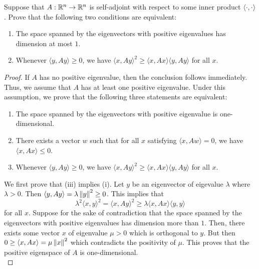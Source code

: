\documentclass[12pt]{article}
\begin{document}
\begin{problem} \label{problem-1.11}
	Suppose that $A : \mathbb{R}^n \to \mathbb{R}^n$ is self-adjoint with respect to some inner product $\langle \cdot, \cdot \rangle$. Prove that the following two conditions are equivalent:
    \begin{enumerate}[label = (\roman*)]
        \item The space spanned by the eigenvectors with positive eigenvalues has dimension at most $1$.
        \item Whenever $\langle y, Ay \rangle \geq 0$, we have $\langle x, Ay \rangle^2 \geq \langle x, Ax \rangle \langle y, Ay \rangle$ for all $x$. 
    \end{enumerate}
\end{problem}

\begin{proof}
	If $A$ has no positive eigenvalue, then the conclusion follows immediately. Thus, we assume that $A$ has at least one positive eigenvalue. Under this assumption, we prove that the following three statements are equivalent:
	\begin{enumerate}[label = (\roman*)]
		\item The space spanned by the eigenvectors with positive eigenvalue is one-dimensional.
		\item There exists a vector $w$ such that for all $x$ satisfying $\langle x , Aw \rangle = 0$, we have $\langle x, Ax \rangle \leq 0$.
		\item Whenever $\langle y, Ay \rangle \geq 0$, we have $\langle x, Ay \rangle^2 \geq \langle x, Ax \rangle \langle y, Ay \rangle$ for all $x$. 
	\end{enumerate}
	We first prove that (iii) implies (i). Let $y$ be an eigenvector of eigevalue $\lambda$ where $\lambda > 0$. Then $\langle y, Ay \rangle = \lambda \left\lVert y\right\rVert^2 \geq 0$. This implies that 
	\[
		\lambda^2 \langle x, y \rangle^2 = \langle x, Ay \rangle^2 \geq \lambda \langle x, Ax \rangle  \langle y, y \rangle
	\]
	for all $x$. Suppose for the sake of contradiction that the space spanned by the eigenvectors with positive eigenvalues has dimension more than $1$. Then, there exists some vector $x$ of eigenvalue $\mu > 0$ which is orthogonal to $y$. But then $0 \geq \langle x, Ax \rangle = \mu \left\lVert x\right\rVert^2$ which contradicts the positivity of $\mu$. This proves that the positive eigenspace of $A$ is one-dimensional. \\


\end{proof}
\end{document}
